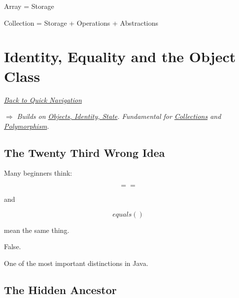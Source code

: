 \documentclass[11pt,a4paper]{book}
\begin{document}

Array
=
Storage


Collection
=
Storage
+
Operations
+
Abstractions
\chapter{Identity, Equality and the Object Class}

\smallskip
\noindent
\hyperref[sec:quick_nav]{\emph{Back to Quick Navigation}}

\smallskip
\noindent
\textcolor{RosettaRoyalPurple}{$\Rightarrow$}
\emph{Builds on \hyperref[chap:objects_identity]{Objects, Identity, State}. Fundamental for \hyperref[chap:collections]{Collections} and \hyperref[chap:polymorphism]{Polymorphism}.}


\section{The Twenty Third Wrong Idea}

\begin{trap}

Many beginners think:


\[
==
\]

and


\[
equals()
\]

mean the same thing.


False.


One of the most important distinctions
in Java.

\end{trap}


\section{The Hidden Ancestor}
\end{document}
